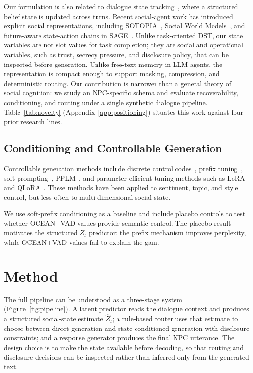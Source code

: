 \documentclass[11pt]{article}
\begin{document}
Our formulation is also related to dialogue state tracking~\cite{mrksic2017neural,feng2023dialogue,jacqmin2024dialoguestate}, where a structured belief state is updated across turns.
Recent social-agent work has introduced explicit social representations, including SOTOPIA~\cite{zhou2024sotopia}, Social World Models~\cite{zhou2025social}, and future-aware state-action chains in SAGE~\cite{sage2025steering}.
Unlike task-oriented DST, our state variables are not slot values for task completion; they are social and operational variables, such as trust, secrecy pressure, and disclosure policy, that can be inspected before generation.
Unlike free-text memory in LLM agents, the representation is compact enough to support masking, compression, and deterministic routing.
Our contribution is narrower than a general theory of social cognition: we study an NPC-specific schema and evaluate recoverability, conditioning, and routing under a single synthetic dialogue pipeline.
Table~\ref{tab:novelty} (Appendix~\ref{app:positioning}) situates this work against four prior research lines.

\subsection{Conditioning and Controllable Generation}

Controllable generation methods include discrete control codes~\cite{keskar2019ctrl}, prefix tuning~\cite{li2021prefix}, soft prompting~\cite{lester2021power}, PPLM~\cite{dathathri2020plug}, and parameter-efficient tuning methods such as LoRA~\cite{hu2021lora} and QLoRA~\cite{dettmers2023qlora}.
These methods have been applied to sentiment, topic, and style control, but less often to multi-dimensional social state.

We use soft-prefix conditioning as a baseline and include placebo controls to test whether OCEAN+VAD values provide semantic control.
The placebo result motivates the structured $Z_t$ predictor: the prefix mechanism improves perplexity, while OCEAN+VAD values fail to explain the gain.

\section{Method}
\label{sec:method}

The full pipeline can be understood as a three-stage system (Figure~\ref{fig:pipeline}). 
A latent predictor reads the dialogue context and produces a structured social-state estimate $\hat{Z}_t$; a rule-based router uses that estimate to choose between direct generation and state-conditioned generation with disclosure constraints; and a response generator produces the final NPC utterance. The design choice is to make the state available before decoding, so that routing and disclosure decisions can be inspected rather than inferred only from the generated text.
\end{document}
